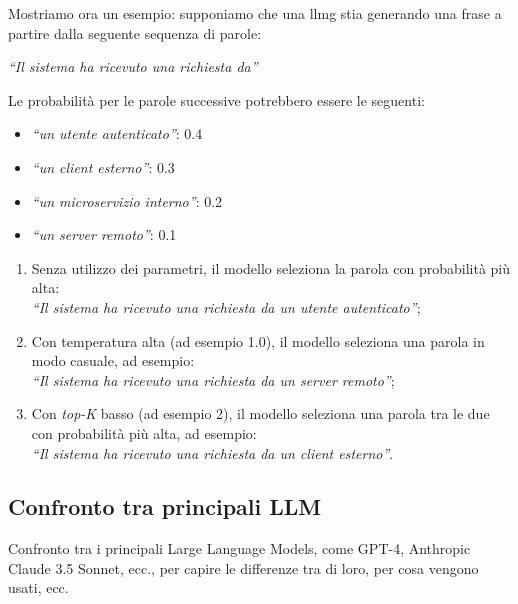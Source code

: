 \noindent Mostriamo ora un esempio: supponiamo che una \gls{llmg} stia generando una frase a partire dalla seguente sequenza di parole: 
\begin{center}
    \textit{``Il sistema ha ricevuto una richiesta da''}\\
\end{center}

Le probabilità per le parole successive potrebbero essere le seguenti:
\begin{itemize}
    \item \textit{``un utente autenticato''}: 0.4
    \item \textit{``un client esterno''}: 0.3
    \item \textit{``un microservizio interno''}: 0.2
    \item \textit{``un server remoto''}: 0.1
\end{itemize}
\pagebreak
\begin{enumerate}
    \item Senza utilizzo dei parametri, il modello seleziona la parola con probabilità più alta: \\
    \textit{``Il sistema ha ricevuto una richiesta da un utente autenticato''};
    \item Con temperatura alta (ad esempio 1.0), il modello seleziona una parola in modo casuale, ad esempio: \\
    \textit{``Il sistema ha ricevuto una richiesta da un server remoto''};
    \item Con \textit{top-K} basso (ad esempio 2), il modello seleziona una parola tra le due con probabilità più alta, ad esempio: \\
    \textit{``Il sistema ha ricevuto una richiesta da un client esterno''}.
\end{enumerate}

\subsection{Confronto tra principali LLM}
\label{subsec:llm-confronto}

Confronto tra i principali Large Language Models, come GPT-4, Anthropic Claude 3.5 Sonnet, ecc., per capire le differenze tra di loro, per cosa vengono usati, ecc.